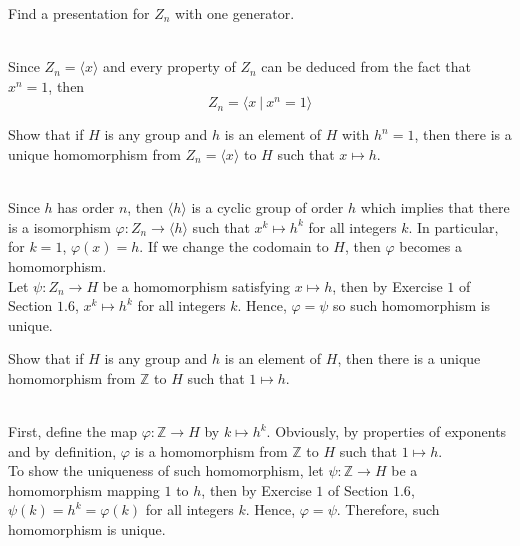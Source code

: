 \begin{exercise}
    Find a presentation for $Z_n$ with one generator.\\
\end{exercise}

\begin{solution}
    \\ Since $Z_n=\langle x \rangle$ and every property of $Z_n$ can be 
    deduced from the fact that $x^n=1$, then
    $$Z_n=\langle x \ | \ x^n=1\rangle$$
\end{solution}

\begin{exercise}
    Show that if $H$ is any group and $h$ is an element of $H$ with $h^n=1$,
    then there is a unique homomorphism from $Z_n=\langle x\rangle$ to $H$
    such that $x\mapsto h$.\\
\end{exercise}

\begin{solution}
    \\Since $h$ has order $n$, then $\langle h\rangle$ is a cyclic group of
    order $h$ which implies that there is a isomorphism $\varphi:Z_n \to
    \langle h\rangle$ such that $x^k\mapsto h^k$ for all integers $k$. In
    particular, for $k=1$, $\varphi(x)=h$. If we change the codomain to
    $H$, then $\varphi$ becomes a homomorphism.\\
    Let $\psi:Z_n \to H$ be a homomorphism satisfying $x\mapsto h$,
    then by Exercise $1$ of Section $1.6$, $x^k\mapsto h^k$ for all integers
    $k$. Hence, $\varphi=\psi$ so such homomorphism is unique.\\
\end{solution}

\begin{exercise}
    Show that if $H$ is any group and $h$ is an element of $H$, then there
    is a unique homomorphism from $\mathbb{Z}$ to $H$ such that
    $1\mapsto h$.\\
\end{exercise}

\begin{solution}
    \\First, define the map $\varphi:\mathbb{Z}\to H$ by $k\mapsto h^k$.
    Obviously, by properties of exponents and by definition, $\varphi$
    is a homomorphism from $\mathbb{Z}$ to $H$ such that $1\mapsto h$.\\
    To show the uniqueness of such homomorphism, let $\psi:\mathbb{Z}\to H$
    be a homomorphism mapping $1$ to $h$, then by Exercise $1$ of Section
    $1.6$, $\psi(k)=h^k=\varphi(k)$ for all integers $k$. Hence, $\varphi
    = \psi$. Therefore, such homomorphism is unique.\\
\end{solution}

